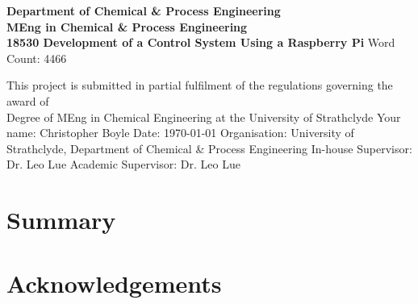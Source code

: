 \documentclass[a4]{report}
\def\atitle{Development of a Control System Using a Raspberry Pi}
\def\thewords{4466}
\def\achapter{preamble}  %
\begin{document}
	\begin{titlepage}
		\centering
		\vskip3cm
		{
			\bfseries\Large
			Department of Chemical \& Process Engineering\\
			\vskip1cm
			MEng in Chemical \& Process Engineering\\
			18530
			\vskip3cm
			\LARGE\atitle
		}
		\vskip3cm
		{\small Word Count: \thewords}
		\vskip1cm
		\begin{flushleft}
			This project is submitted in partial fulfilment of the regulations governing the award of \\
			Degree of MEng in Chemical Engineering at the University of Strathclyde
			\vskip2cm
			Your name: Christopher Boyle \hfill Date: \today
			\vskip1cm
			Organisation: University of Strathclyde, Department of Chemical \& Process Engineering\newline%
			In-house Supervisor: Dr. Leo Lue \newline%
			Academic Supervisor: Dr. Leo Lue
		\end{flushleft}
	\end{titlepage}

	
	\chapter*{Summary}
	\def\achapter{Summary}
	
	\def\achapter{Contents}
	\tableofcontents
	
	\chapter*{Acknowledgements}
	\def\achapter{Acknowledgements}
	
\end{document}
